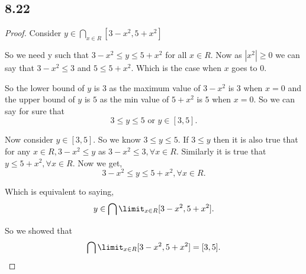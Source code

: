 \documentclass[a4paper]{report}
\begin{document}
\subsection*{8.22}
\begin{proof}
    Consider $y \in \bigcap\limits_{x \in R} [3 - x^2, 5 + x^2]$

    So we need y such that $3 -x^2 \leq y \leq 5 + x^2$ for all $x \in R$. Now as $|x^2| \geq 0$ we can say that $3 - x^2 \leq 3$ and $5 \leq 5 + x^2$. Which is the case when $x$ goes to $0.$

    So the lower bound of  $y$ is  $3$ as the maximum value of  $3 - x^2$ is $3$ when  $x = 0$ and the upper bound of  $y$ is $5$ as the min value of $5 + x^2$ is $5$ when $x = 0$. So we can say for sure that  \[
        3 \leq y \leq 5  \text { or } y \in [3,5]
    .\] 

    Now consider $y \in [3,5]$. So we know  $3 \leq y \leq 5$. If  $3 \leq y$ then it is also true that for any  $x \in R, 3 - x^2 \leq y$ as $3 -x^2 \leq 3, \forall x \in R$. Similarly it is true that $y \leq 5 + x^2, \forall x \in R$. Now we get, \[
    3-x^2 \leq y \leq 5 + x^2, \forall x \in R
    .\] 

    Which is equivalent to saying, \[
        y \in \bigcap\limit_{x \in R} [3 - x^2,5 + x^2]
    .\] 

    So we showed that \[
        \bigcap\limit_{x \in R} [3 - x^2,5 + x^2] = [3,5]
    .\] 

\end{proof}
\end{document}
